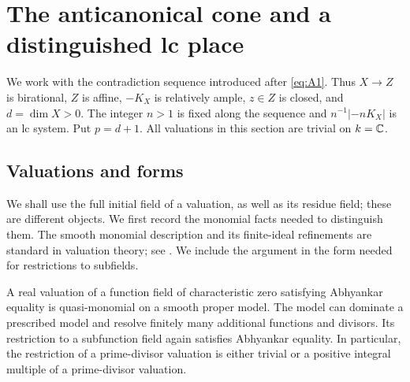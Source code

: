 \section{The anticanonical cone and a distinguished lc place}
\label{a:cone}

We work with the contradiction sequence introduced after
\eqref{eq:A1}. Thus \(X\to Z\) is birational, \(Z\) is affine,
\(-K_X\) is relatively ample, \(z\in Z\) is closed, and
\(d=\dim X>0\). The integer \(n>1\) is fixed along the sequence and
\(n^{-1}|-nK_X|\) is an lc system. Put \(p=d+1\).
All valuations in this section are trivial on \(k=\mathbb C\).

\subsection{Valuations and forms}

We shall use the full initial field of a valuation, as well as its residue
field; these are different objects. We first record the monomial facts
needed to distinguish them. The smooth monomial description and its
finite-ideal refinements are standard in valuation theory; see
\cite[Proposition~3.7 and Lemma~3.6]{JM}. We include the argument in the
form needed for restrictions to subfields.

\begin{lemma}\label{a:abhyankar}
A real valuation of a function field of characteristic zero satisfying
Abhyankar equality is quasi-monomial on a smooth proper model.
The model can dominate a prescribed model and resolve finitely many
additional functions and divisors. Its restriction to a subfunction field
again satisfies Abhyankar equality. In particular, the restriction of a
prime-divisor valuation is either trivial or a positive integral multiple
of a prime-divisor valuation.
\end{lemma}

